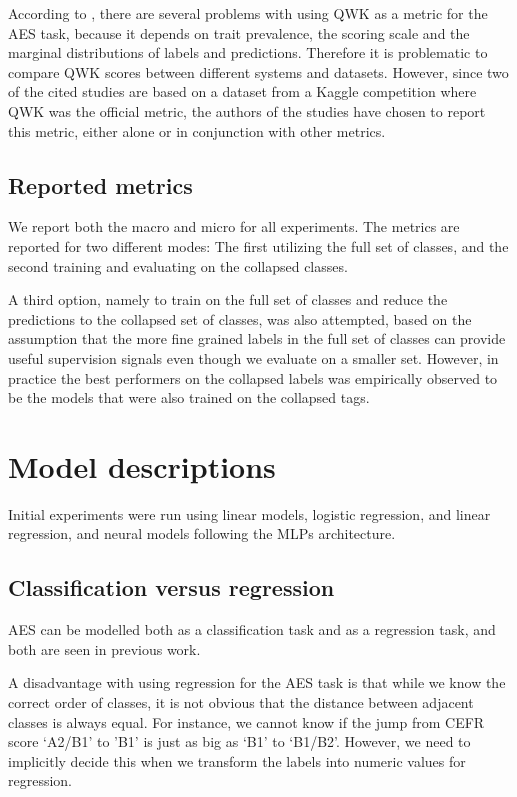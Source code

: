 According to \textcite{yannakoudakis2015evaluating}, there are several
problems with using \ac{QWK} as a metric for the \ac{AES} task, because it
depends on trait prevalence, the scoring scale and the marginal distributions
of labels and predictions. Therefore it is problematic to compare \ac{QWK}
scores between different systems and datasets. However, since two of the
cited studies are based on a dataset from a Kaggle competition where \ac{QWK}
was the official metric, the authors of the studies have chosen to report
this metric, either alone or in conjunction with other metrics.


\subsection{Reported metrics}

We report both the macro and micro \FI for all experiments. The metrics are
reported for two different modes: The first utilizing the full set of
classes, and the second training and evaluating on the collapsed classes.

A third option, namely to train on the full set of classes and reduce the
predictions to the collapsed set of classes, was also attempted, based on the
assumption that the more fine grained labels in the full set of classes can
provide useful supervision signals even though we evaluate on a smaller set.
However, in practice the best performers on the collapsed labels was
empirically observed to be the models that were also trained on the collapsed
tags.


\section{Model descriptions}

Initial experiments were run using linear models, logistic regression,
and linear regression, and neural models following the \acp{MLP} architecture.


\subsection{Classification versus regression}

\ac{AES} can be modelled both as a classification task and as a regression
task, and both are seen in previous work.

A disadvantage with using regression for the AES task is that while we know the
correct order of classes, it is not obvious that the distance between adjacent
classes is always equal. For instance, we cannot know if the jump from CEFR
score `A2/B1' to 'B1' is just as big as `B1' to `B1/B2'. However, we need to
implicitly decide this when we transform the labels into numeric values for
regression.

